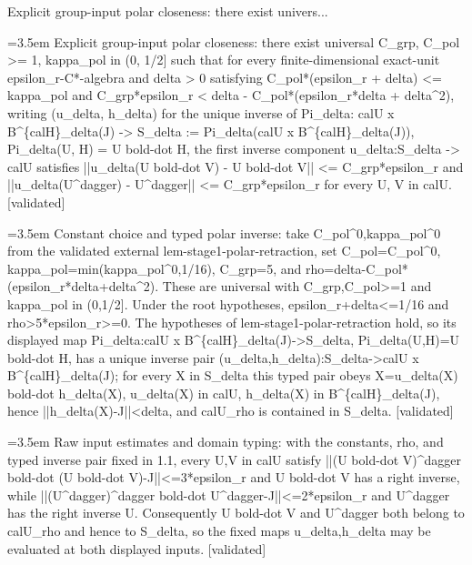 \documentclass{article}
\newcommand{\step}[1]{\par\noindent\hangindent=3.5em\hangafter=1%
  \makebox[3.5em][l]{\textbf{#1.}}}
\newcommand{\steptag}[1]{\hfill{\small\textsf{[#1]}}}
\begin{document}
\begin{proofbox}{Explicit group-input polar closeness: there exist univers...}
\step{1} Explicit group-input polar closeness: there exist universal C\_grp, C\_pol >= 1, kappa\_pol in (0, 1/2] such that for every finite-dimensional exact-unit epsilon\_r-C*-algebra and delta > 0 satisfying C\_pol*(epsilon\_r + delta) <= kappa\_pol and C\_grp*epsilon\_r < delta - C\_pol*(epsilon\_r*delta + delta\textasciicircum{}2), writing (u\_delta, h\_delta) for the unique inverse of Pi\_delta: calU x B\textasciicircum{}\{calH\}\_delta(J) -> S\_delta := Pi\_delta(calU x B\textasciicircum{}\{calH\}\_delta(J)), Pi\_delta(U, H) = U bold-dot H, the first inverse component u\_delta:S\_delta -> calU satisfies ||u\_delta(U bold-dot V) - U bold-dot V|| <= C\_grp*epsilon\_r and ||u\_delta(U\textasciicircum{}dagger) - U\textasciicircum{}dagger|| <= C\_grp*epsilon\_r for every U, V in calU. \steptag{validated} \\[6pt]
\step{1.1} Constant choice and typed polar inverse: take C\_pol\textasciicircum{}0,kappa\_pol\textasciicircum{}0 from the validated external lem-stage1-polar-retraction, set C\_pol=C\_pol\textasciicircum{}0, kappa\_pol=min(kappa\_pol\textasciicircum{}0,1/16), C\_grp=5, and rho=delta-C\_pol*(epsilon\_r*delta+delta\textasciicircum{}2). These are universal with C\_grp,C\_pol>=1 and kappa\_pol in (0,1/2]. Under the root hypotheses, epsilon\_r+delta<=1/16 and rho>5*epsilon\_r>=0. The hypotheses of lem-stage1-polar-retraction hold, so its displayed map Pi\_delta:calU x B\textasciicircum{}\{calH\}\_delta(J)->S\_delta, Pi\_delta(U,H)=U bold-dot H, has a unique inverse pair (u\_delta,h\_delta):S\_delta->calU x B\textasciicircum{}\{calH\}\_delta(J); for every X in S\_delta this typed pair obeys X=u\_delta(X) bold-dot h\_delta(X), u\_delta(X) in calU, h\_delta(X) in B\textasciicircum{}\{calH\}\_delta(J), hence ||h\_delta(X)-J||<delta, and calU\_rho is contained in S\_delta. \steptag{validated} \\[4pt]
\step{1.2} Raw input estimates and domain typing: with the constants, rho, and typed inverse pair fixed in 1.1, every U,V in calU satisfy ||(U bold-dot V)\textasciicircum{}dagger bold-dot (U bold-dot V)-J||<=3*epsilon\_r and U bold-dot V has a right inverse, while ||(U\textasciicircum{}dagger)\textasciicircum{}dagger bold-dot U\textasciicircum{}dagger-J||<=2*epsilon\_r and U\textasciicircum{}dagger has the right inverse U. Consequently U bold-dot V and U\textasciicircum{}dagger both belong to calU\_rho and hence to S\_delta, so the fixed maps u\_delta,h\_delta may be evaluated at both displayed inputs. \steptag{validated} \\[6pt]

\end{proofbox}
\end{document}
